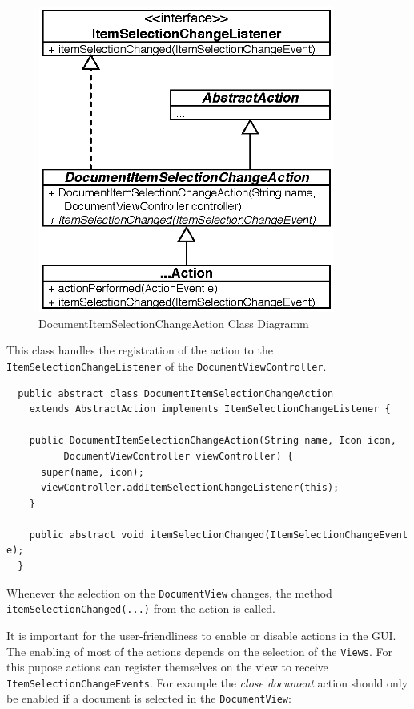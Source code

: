 \begin{figure}[H]
\begin{center}
  \includegraphics[height=3.97in, width=3.85in]{../images/finalreport/application_action.eps}
\caption{DocumentItemSelectionChangeAction Class Diagramm}
\label{application_application_action}
\end{center}
\end{figure}

This class handles the registration of the action to the \texttt{Item\-Selection\-Change\-Listener} of  the \texttt{Document\-View\-Controller}.

\begin{verbatim}
  public abstract class DocumentItemSelectionChangeAction
    extends AbstractAction implements ItemSelectionChangeListener {
  
    public DocumentItemSelectionChangeAction(String name, Icon icon,
          DocumentViewController viewController) {
      super(name, icon);
      viewController.addItemSelectionChangeListener(this);
    }
    
    public abstract void itemSelectionChanged(ItemSelectionChangeEvent e);
  }
\end{verbatim}

Whenever the selection on the \texttt{Document\-View} changes, the method \texttt{itemSelectionChanged(...)} from the action is called.

It is important for the user-friendliness to enable or disable actions in the GUI. The enabling of most of the actions depends on the selection of the \texttt{Views}. For this pupose actions can register themselves on the view to receive \texttt{Item\-Selection\-Change\-Events}.  For example the \emph{close document} action should only be enabled if a document is selected in the \texttt{Document\-View}:

